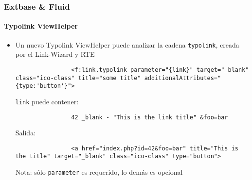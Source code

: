 
\begin{frame}[fragile]
	\frametitle{Extbase \& Fluid}
	\framesubtitle{Typolink ViewHelper}

	\lstset{
		basicstyle=\tiny\ttfamily
	}

	\begin{itemize}
		\item Un nuevo Typolink ViewHelper puede analizar la cadena \texttt{typolink}, creada por el Link-Wizard y RTE

			\begin{lstlisting}
				<f:link.typolink parameter="{link}" target="_blank" class="ico-class" title="some title" additionalAttributes="{type:'button'}">
			\end{lstlisting}

			\texttt{link} puede contener:
			\begin{lstlisting}
				42 _blank - "This is the link title" &foo=bar
			\end{lstlisting}

			Salida:
			\begin{lstlisting}
				<a href="index.php?id=42&foo=bar" title="This is the title" target="_blank" class="ico-class" type="button">
			\end{lstlisting}

			Nota: sólo \texttt{parameter} es requerido, lo demás es opcional

	\end{itemize}

\end{frame}



